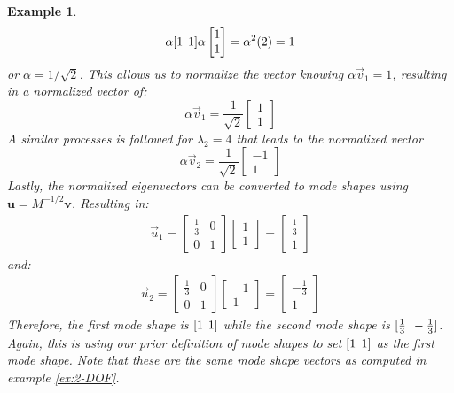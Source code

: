 \documentclass[12pt,letter]{article}
\newtheorem{ex}{Example}
\numberwithin{ex}{section} %
\newenvironment{example}{\begin{mdframed}[middlelinewidth=0.5mm]\begin{ex}\normalfont}{\end{ex}\end{mdframed}}
\numberwithin{re}{section} %
\begin{document}
\begin{example}
\begin{equation}
\alpha [1 \hspace{1ex} 1]\alpha  \begin{bmatrix} 1 \\  1 \end{bmatrix}  = \alpha^2(2) = 1
\end{equation}
or $\alpha = 1/\sqrt{2}$. This allows us to normalize the vector knowing $\alpha \vec{v}_1=1$, resulting in a normalized vector of:
\begin{equation}
\alpha \vec{v}_1=  \frac{1}{\sqrt{2}} \begin{bmatrix} 1 \\ 1 \end{bmatrix} 
\end{equation} 
A similar processes is followed for $\lambda_2=4$ that leads to the normalized vector 
\begin{equation}
\alpha \vec{v}_2=  \frac{1}{\sqrt{2}} \begin{bmatrix} -1 \\ 1 \end{bmatrix} 
\end{equation} 
Lastly, the normalized eigenvectors can be converted to mode shapes using $\textbf{u} = M^{-1/2}\textbf{v}$. Resulting in: 
\begin{eqnarray}
\vec{u}_1 =  \begin{bmatrix} \frac{1}{3} & 0  \\  0 & 1 \end{bmatrix}   \begin{bmatrix} 1 \\  1 \end{bmatrix} =  \begin{bmatrix} \frac{1}{3} \\  1 \end{bmatrix}
\end{eqnarray}
and:
\begin{eqnarray}
\vec{u}_2 =  \begin{bmatrix} \frac{1}{3} & 0  \\  0 & 1 \end{bmatrix}   \begin{bmatrix} -1 \\  1 \end{bmatrix} =  \begin{bmatrix} -\frac{1}{3} \\  1 \end{bmatrix}
\end{eqnarray}
Therefore, the first mode shape is $[1 \hspace{1ex} 1]$ while the second mode shape is $[\frac{1}{3} \hspace{1ex} -\frac{1}{3}]$. Again, this is using our prior definition of mode shapes to set $[1 \hspace{1ex} 1]$ as the first mode shape. Note that these are the same mode shape vectors as computed in example \ref{ex:2-DOF}.
\end{example}
\end{document}
